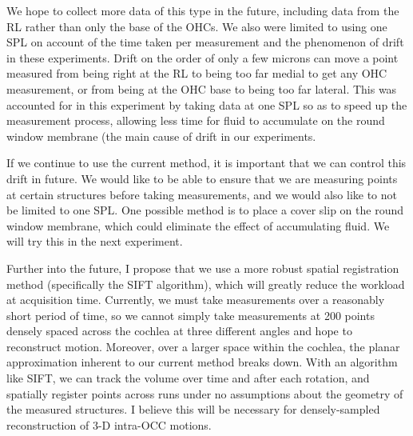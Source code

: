 \documentclass{article}
\begin{document}
\par{We hope to collect more data of this type in the future, including data from the RL rather than only the base of the OHCs. We also were limited to using one SPL on account of the time taken per measurement and the phenomenon of drift in these experiments. Drift on the order of only a few microns can move a point measured from being right at the RL to being too far medial to get any OHC measurement, or from being at the OHC base to being too far lateral. This was accounted for in this experiment by taking data at one SPL so as to speed up the measurement process, allowing less time for fluid to accumulate on the round window membrane (the main cause of drift in our experiments.}
\par{If we continue to use the current method, it is important that we can control this drift in future. We would like to be able to ensure that we are measuring points at certain structures before taking measurements, and we would also like to not be limited to one SPL. One possible method is to place a cover slip on the round window membrane, which could eliminate the effect of accumulating fluid. We will try this in the next experiment.}
\par{Further into the future, I propose that we use a more robust spatial registration method (specifically the SIFT algorithm), which will greatly reduce the workload at acquisition time. Currently, we must take measurements over a reasonably short period of time, so we cannot simply take measurements at 200 points densely spaced across the cochlea at three different angles and hope to reconstruct motion. Moreover, over a larger space within the cochlea, the planar approximation inherent to our current method breaks down. With an algorithm like SIFT, we can track the volume over time and after each rotation, and spatially register points across runs under no assumptions about the geometry of the measured structures. I believe this will be necessary for densely-sampled reconstruction of 3-D intra-OCC motions.}
\end{document}
